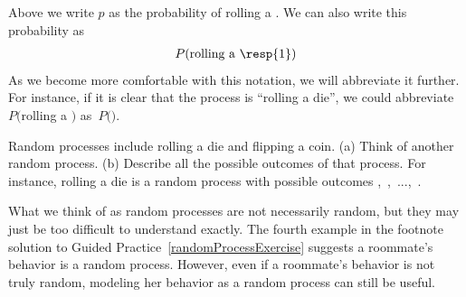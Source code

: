 Above we write $p$ as the probability of rolling a . We can also write this probability as
\begin{align*}
P(\text{rolling a \resp{1}})
\end{align*}
As we become more comfortable with this notation, we will abbreviate it further. For instance, if it is clear that the process is ``rolling a die'', we could abbreviate $P($rolling a $)$ as~$P($$)$. 

\begin{exercisewrap}
\begin{nexercise} \label{randomProcessExercise}
Random processes include rolling a die and flipping a coin. (a) Think of another random process. (b) Describe all the possible outcomes of that process. For instance, rolling a die is a random process with possible outcomes \mbox{, , ..., }.\footnotemark
\end{nexercise}
\end{exercisewrap}

What we think of as random processes are not necessarily random, but they may just be too difficult to understand exactly. The fourth example in the footnote solution to Guided Practice~\ref{randomProcessExercise} suggests a roommate's behavior is a random process. However, even if a roommate's behavior is not truly random, modeling her behavior as a random process can still be useful. 



